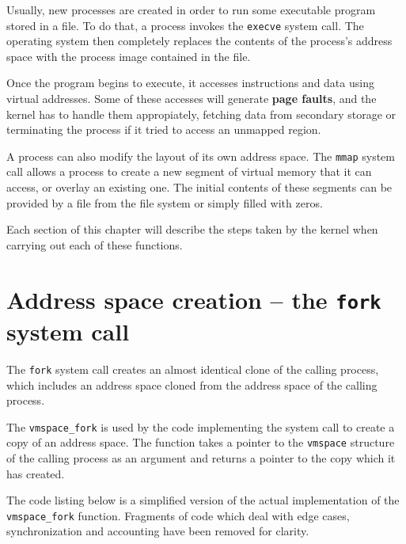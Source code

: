 \documentclass[shortabstract, english]{iithesis}
\begin{document}
Usually, new processes are created in order to run some executable program
stored in a file. To do that, a process invokes the \texttt{execve}
\cite{freebsd:execve} system call. The operating system then completely replaces
the contents of the process's address space with the process image contained in
the file.

Once the program begins to execute, it accesses instructions and data using
virtual addresses. Some of these accesses will generate \textbf{page faults},
and the kernel has to handle them appropiately, fetching data from secondary
storage or terminating the process if it tried to access an unmapped region.

A process can also modify the layout of its own address space. The \texttt{mmap}
\cite{freebsd:mmap} system call allows a process to create a new segment of
virtual memory that it can access, or overlay an existing one. The initial
contents of these segments can be provided by a file from the file system or
simply filled with zeros.

Each section of this chapter will describe the steps taken by the kernel when
carrying out each of these functions.

\section{Address space creation -- the \texttt{fork} system call}

The \texttt{fork} \cite{freebsd:fork} system call creates an almost identical clone of the calling
process, which includes an address space cloned from the address space of the
calling process.

The \texttt{vmspace_fork} is used by the code implementing the system
call to create a copy of an address space. The function takes a pointer to the
\texttt{vmspace} structure of the calling process as an argument and
returns a pointer to the copy which it has created.

The code listing below is a simplified version of the actual implementation of
the \texttt{vmspace_fork} function. Fragments of code which deal with
edge cases, synchronization and accounting have been removed for clarity.
\end{document}
